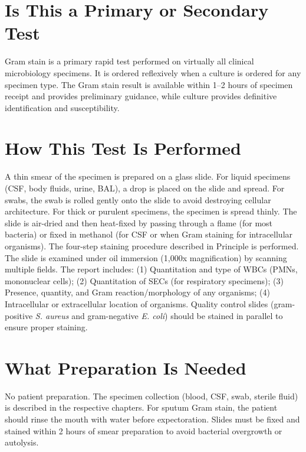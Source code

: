 \section*{Is This a Primary or Secondary Test}
Gram stain is a primary rapid test performed on virtually all clinical microbiology specimens. It is ordered reflexively when a culture is ordered for any specimen type. The Gram stain result is available within 1--2 hours of specimen receipt and provides preliminary guidance, while culture provides definitive identification and susceptibility.

\section*{How This Test Is Performed}
A thin smear of the specimen is prepared on a glass slide. For liquid specimens (CSF, body fluids, urine, BAL), a drop is placed on the slide and spread. For swabs, the swab is rolled gently onto the slide to avoid destroying cellular architecture. For thick or purulent specimens, the specimen is spread thinly. The slide is air-dried and then heat-fixed by passing through a flame (for most bacteria) or fixed in methanol (for CSF or when Gram staining for intracellular organisms). The four-step staining procedure described in Principle is performed. The slide is examined under oil immersion (1,000x magnification) by scanning multiple fields. The report includes: (1) Quantitation and type of WBCs (PMNs, mononuclear cells); (2) Quantitation of SECs (for respiratory specimens); (3) Presence, quantity, and Gram reaction/morphology of any organisms; (4) Intracellular or extracellular location of organisms. Quality control slides (gram-positive \textit{S. aureus} and gram-negative \textit{E. coli}) should be stained in parallel to ensure proper staining.

\section*{What Preparation Is Needed}
No patient preparation. The specimen collection (blood, CSF, swab, sterile fluid) is described in the respective chapters. For sputum Gram stain, the patient should rinse the mouth with water before expectoration. Slides must be fixed and stained within 2 hours of smear preparation to avoid bacterial overgrowth or autolysis.


